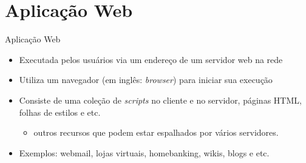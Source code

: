 \section{Aplicação Web}
\begin{frame}{Aplicação Web}
  \begin{itemize}
    \item Executada pelos usuários via \alert{um endereço} de um servidor web na rede
    \item Utiliza um \alert{navegador} (em inglês: \textit{browser}) para iniciar sua execução
    \item Consiste de uma coleção de \alert{\textit{scripts}} no cliente e 
    no servidor, páginas \alert{HTML}, folhas de estilos e etc.
    \begin{itemize}
    	\item outros recursos que podem estar espalhados por vários servidores.  
    \end{itemize}
	\item Exemplos: webmail, lojas virtuais, homebanking, wikis, blogs e etc.
  \end{itemize}

\framebreak


\end{frame}
